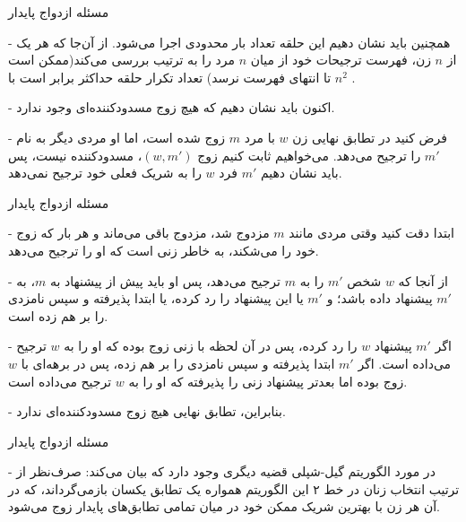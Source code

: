 \begin{itemframe}{مسئله ازدواج پایدار}
\item[-]
همچنین باید نشان دهیم این حلقه‌ تعداد بار محدودی اجرا می‌شود.
 از آن‌جا که هر یک از $n$ زن، فهرست ترجیحات خود از میان $n$ مرد را به ترتیب بررسی می‌کند‌(ممکن است تا انتهای فهرست نرسد) تعداد تکرار حلقه حداکثر برابر است با
$n^2$
.
\item[-]
اکنون باید نشان دهیم که هیچ زوج مسدودکننده‌ای وجود ندارد.
\item[-]
فرض کنید در تطابق نهایی زن $w$ با مرد $m$ زوج شده است، اما او مردی دیگر به نام $m'$ را ترجیح می‌دهد.
می‌خواهیم ثابت کنیم زوج $(w, m')$، مسدودکننده نیست، پس باید نشان دهیم $m'$ فرد $w$ را به شریک فعلی خود ترجیح نمی‌دهد.
\end{itemframe}


\begin{itemframe}{مسئله ازدواج پایدار}
\item[-]
ابتدا دقت کنید وقتی مردی مانند $m$ مزدوج شد، مزدوج باقی می‌ماند و هر بار که زوج خود را می‌شکند، به خاطر زنی است که او را ترجیح می‌دهد.
\item[-]
از آنجا که $w$ شخص $m'$ را به $m$ ترجیح می‌دهد، پس او باید پیش از پیشنهاد به $m$، به $m'$ پیشنهاد داده باشد؛ و $m'$ یا این پیشنهاد را رد کرده، یا ابتدا پذیرفته و سپس نامزدی را بر هم زده است.
\item[-]
اگر $m'$ پیشنهاد $w$ را رد کرده، پس در آن لحظه با زنی زوج بوده که او را به $w$ ترجیح می‌داده است.
 اگر $m'$ ابتدا پذیرفته و سپس نامزدی را بر هم زده، پس در برهه‌ای با $w$ زوج بوده اما بعدتر پیشنهاد زنی را پذیرفته که او را به $w$ ترجیح می‌داده است.
\item[-]
بنابراین، تطابق نهایی هیچ زوج مسدودکننده‌ای ندارد.
\end{itemframe}


\begin{itemframe}{مسئله ازدواج پایدار}
\item[-]
در مورد الگوریتم گیل-شپلی قضیه دیگری وجود دارد که بیان می‌کند: صرف‌نظر از ترتیب انتخاب زنان در خط ۲ این الگوریتم همواره یک تطابق یکسان بازمی‌گرداند، که در آن هر زن با بهترین شریک ممکن خود در میان تمامی تطابق‌های پایدار زوج می‌شود.

\end{itemframe}